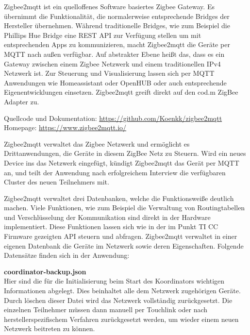 Zigbee2mqtt ist ein quelloffenes Software basiertes Zigbee Gateway. Es übernimmt die Funktionalität, die normalerweise entsprechende
Bridges der Hersteller übernehmen. Während traditionelle Bridges, wie zum Beispiel die Phillips Hue Bridge eine REST API zur Verfügung stellen um mit entsprechenden
Apps zu kommunizieren, macht Zigbee2mqtt die Geräte per MQTT nach außen verfügbar. Auf abstrakter Ebene heißt das, dass es ein Gateway zwischen einem Zigbee Netzwerk und
einem traditionellen IPv4 Netzwerk ist. Zur Steuerung und Visualisierung lassen sich per MQTT Anwendungen wie \grqq Homeassistant\grqq{} oder \grqq OpenHUB\grqq{} oder auch entsprechende
Eigenentwicklungen einsetzen. Zigbee2mqtt greift direkt auf den cod.m ZigBee Adapter zu.

Quellcode und Dokumentation: \url{https://github.com/Koenkk/zigbee2mqtt} \\
Homepage: \url{https://www.zigbee2mqtt.io/}

Zigbee2mqtt verwaltet das Zigbee Netzwerk und ermöglicht es Drittanwendungen, die Geräte in diesem ZigBee Netz zu Steuern. Wird ein neues Device ins das Netzwerk eingefügt, 
kündigt Zigbee2mqtt das Gerät per MQTT an, und teilt der Anwendung nach erfolgreichem Interview die verfügbaren Cluster des neuen Teilnehmers mit.

Zigbee2mqtt verwaltet drei Datenbanken, welche die Funktionsweiße deutlich machen. Viele Funktionen, wie zum Beispiel die Verwaltung von Routingtabellen und
Verschlüsselung der Kommunikation sind direkt in der Hardware implementiert. Diese Funktionen lassen sich wie in der im Punkt TI CC Firmware gezeigten API steuern und abfragen.
Zigbee2mqtt verwaltet in einer eigenen Datenbank die Geräte im Netzwerk sowie deren Eigenschaften.
Folgende Datensätze finden sich in der Anwendung:

\textbf{coordinator-backup.json}\\

Hier sind die für die Initialisierung beim Start des Koordinators wichtigen Informationen abgelegt. Dies beinhaltet alle dem Netzwerk zugehörigen Geräte.
Durch löschen dieser Datei wird das Netzwerk vollständig zurückgesetzt. Die einzelnen Teilnehmer müssen dann manuell per Touchlink oder nach herstellerspezifischem Verfahren
zurückgesetzt werden, um wieder einem neuen Netzwerk beitreten zu können.


